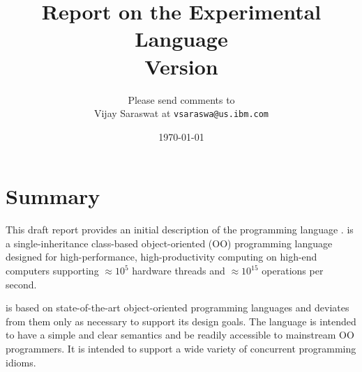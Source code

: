 
\thispagestyle{empty}


\title{Report on the Experimental Language \Xten \\
\large Version \integerversion}
\author{Please send comments to \\
Vijay Saraswat at \texttt{vsaraswa@us.ibm.com}}
\date\today
\maketitle

\fi

\newcommand\authorsc[1]{#1}


\chapter*{Summary}
This draft report provides an initial description of the programming
language \Xten. \Xten{} is a single-inheritance class-based object-oriented
(OO) programming language designed for high-performance, high-productivity
computing on high-end computers supporting $\approx 10^5$ hardware threads
and $\approx 10^{15}$ operations per second. 

{}\Xten{} is based on state-of-the-art object-oriented programming
languages and deviates from them only as necessary to support its
design goals. The language is intended to have a simple and clear
semantics and be readily accessible to mainstream OO programmers. It
is intended to support a wide variety of concurrent programming
idioms.

